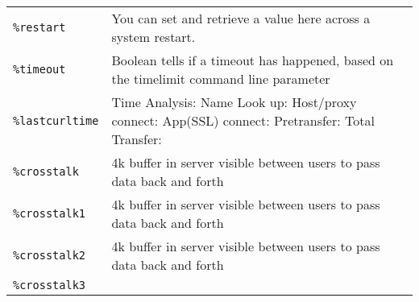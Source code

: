 \documentclass[]{article}
\begin{document}
\begin{longtable}[]{@{}ll@{}}
\begin{minipage}[t]{0.12\columnwidth}
\texttt{\%restart}\strut
\end{minipage} & \begin{minipage}[t]{0.10\columnwidth}\raggedright\strut
You can set and retrieve a value here across a system restart.\strut
\end{minipage}\tabularnewline
\begin{minipage}[t]{0.12\columnwidth}\raggedright\strut
\texttt{\%timeout}\strut
\end{minipage} & \begin{minipage}[t]{0.10\columnwidth}\raggedright\strut
Boolean tells if a timeout has happened, based on the timelimit command
line parameter\strut
\end{minipage}\tabularnewline
\begin{minipage}[t]{0.12\columnwidth}\raggedright\strut
\texttt{\%lastcurltime}\strut
\end{minipage} & \begin{minipage}[t]{0.10\columnwidth}\raggedright\strut
Time Analysis: Name Look up: Host/proxy connect: App(SSL) connect:
Pretransfer: Total Transfer:\strut
\end{minipage}\tabularnewline
\begin{minipage}[t]{0.12\columnwidth}\raggedright\strut
\texttt{\%crosstalk}\strut
\end{minipage} & \begin{minipage}[t]{0.10\columnwidth}\raggedright\strut
4k buffer in server visible between users to pass data back and
forth\strut
\end{minipage}\tabularnewline
\begin{minipage}[t]{0.12\columnwidth}\raggedright\strut
\texttt{\%crosstalk1}\strut
\end{minipage} & \begin{minipage}[t]{0.10\columnwidth}\raggedright\strut
4k buffer in server visible between users to pass data back and
forth\strut
\end{minipage}\tabularnewline
\begin{minipage}[t]{0.12\columnwidth}\raggedright\strut
\texttt{\%crosstalk2}\strut
\end{minipage} & \begin{minipage}[t]{0.10\columnwidth}\raggedright\strut
4k buffer in server visible between users to pass data back and
forth\strut
\end{minipage}\tabularnewline
\begin{minipage}[t]{0.12\columnwidth}\raggedright\strut
\texttt{\%crosstalk3}\strut
\end{minipage} & \begin{minipage}[t]{0.10\columnwidth}\raggedright\strut

\end{minipage}
\end{longtable}
\end{document}
